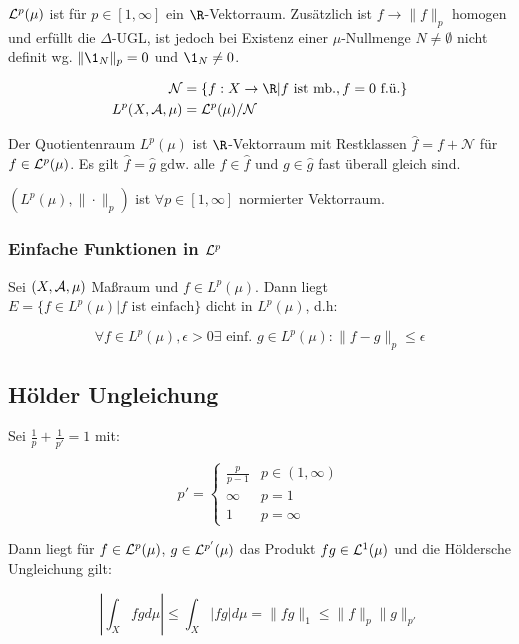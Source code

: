 $\mathcal{L}^p(\mu)$ ist für $p \in [1,\infty]$ ein $\R$-Vektorraum. Zusätzlich ist $f \to \|f\|_p$ homogen und erfüllt die $\Delta$-UGL, ist jedoch bei Existenz einer $\mu$-Nullmenge $N \neq \emptyset$ nicht definit wg. $\|\1_N\|_p = 0$ und $\1_N \neq 0$.

\vspace{-4mm}
\begin{align*}
\mathcal{N} &= \{ f : X \to \R | f \text{ ist mb.}, f = 0 \text{ f.ü.}\} \\
L^p(X,\A,\mu) &= \L^p(\mu) / \mathcal{N}
\end{align*}

Der Quotientenraum $L^p(\mu)$ ist $\R$-Vektorraum mit Restklassen $\hat f = f + \mathcal{N}$ für $f \in \mathcal{L}^p(\mu)$. Es gilt $\hat f = \hat g$ gdw. alle $f \in \hat f$ und $g \in \hat g$ fast überall gleich sind.

\spacing

$(L^p(\mu),\|\cdot\|_p)$ ist $\forall p \in [1,\infty]$ normierter Vektorraum.

\subsubsection*{Einfache Funktionen in $\mathcal{L}^p$}

Sei $(X,\mathcal{A},\mu)$ Maßraum und $f \in L^p(\mu)$. Dann liegt $E = \{ f \in L^p(\mu) | f \text{ ist einfach} \}$ dicht in $L^p(\mu)$, d.h:

\vspace{-4mm}
$$\forall f \in L^p(\mu), \epsilon > 0 \exists \text{ einf. } g \in L^p(\mu) : \| f - g \|_p \leq \epsilon$$

\subsection*{Hölder Ungleichung}

Sei $\frac{1}{p} + \frac{1}{p'} = 1$ mit:

\vspace{-4mm}
$$p' = \begin{cases}
	\frac{p}{p-1} & p \in (1, \infty) \\
	\infty        & p = 1 \\
	1        & p = \infty
\end{cases}$$

Dann liegt für $f \in \mathcal{L}^p(\mu)$, $g \in \mathcal{L}^{p'}(\mu)$ das Produkt $fg \in \mathcal{L}^1(\mu)$ und die Höldersche Ungleichung gilt:

\vspace{-4mm}
$$\left| \int_X fg d\mu \right| \leq \int_X |fg| d\mu = \|fg\|_1 \leq \|f\|_p \|g\|_{p'}$$

